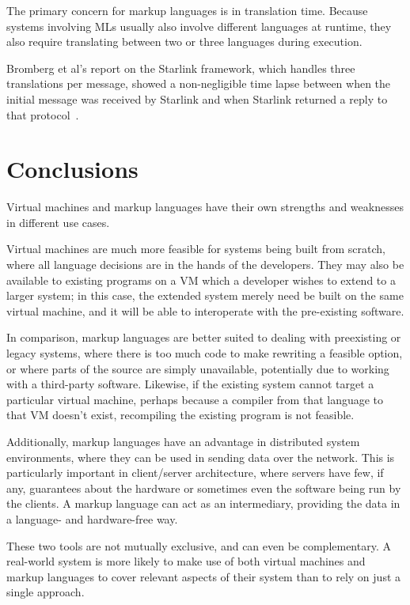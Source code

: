 \documentclass{sig-alternate}
\begin{document}
The primary concern for markup languages is in translation time. Because systems involving MLs usually also involve different languages at runtime, they also require translating between two or three languages during execution.

Bromberg et al's report on the Starlink framework, which handles three translations per message, showed a non-\linebreak negligible time lapse between when the initial message was received by Starlink and when Starlink returned a reply to that protocol~\cite{Bromberg:2011}.




\section{Conclusions}\label{conclusions}


Virtual machines and markup languages have their own strengths and weaknesses in different use cases.

Virtual machines are much more feasible for systems being built from scratch, where all language decisions are in the hands of the developers. They may also be available to existing programs on a VM which a developer wishes to extend to a larger system; in this case, the extended system merely need be built on the same virtual machine, and it will be able to interoperate with the pre-existing software.

In comparison, markup languages are better suited to dealing with preexisting or legacy systems, where there is too much code to make rewriting a feasible option, or where parts of the source are simply unavailable, potentially due to working with a third-party software. Likewise, if the existing system cannot target a particular virtual machine, perhaps because a compiler from that language to that VM doesn't exist, recompiling the existing program is not feasible.

Additionally, markup languages have an advantage in distributed system environments, where they can be used in sending data over the network. This is particularly important in client/server architecture, where servers have few, if any, guarantees about the hardware or sometimes even the software being run by the clients. A markup language can act as an intermediary, providing the data in a language- and hardware-free way.

These two tools are not mutually exclusive, and can even be complementary. A real-world system is more likely to make use of both virtual machines and markup languages to cover relevant aspects of their system than to rely on just a single approach.
\end{document}
